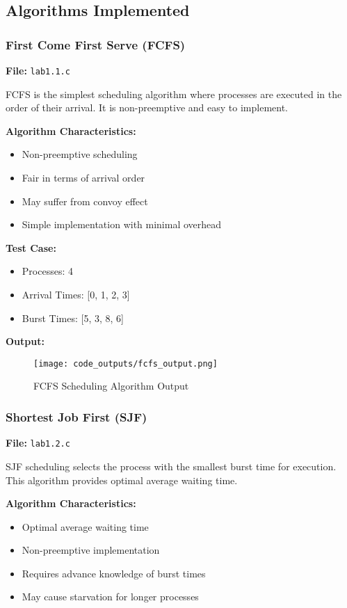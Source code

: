 \documentclass[12pt,a4paper]{article}
\begin{document}
\subsection{Algorithms Implemented}

\subsubsection{First Come First Serve (FCFS)}
\textbf{File:} \texttt{lab1.1.c}

FCFS is the simplest scheduling algorithm where processes are executed in the order of their arrival. It is non-preemptive and easy to implement.

\textbf{Algorithm Characteristics:}
\begin{itemize}
    \item Non-preemptive scheduling
    \item Fair in terms of arrival order
    \item May suffer from convoy effect
    \item Simple implementation with minimal overhead
\end{itemize}

\textbf{Test Case:}
\begin{itemize}
    \item Processes: 4
    \item Arrival Times: [0, 1, 2, 3]
    \item Burst Times: [5, 3, 8, 6]
\end{itemize}

\textbf{Output:}
\begin{figure}[H]
    \centering
    \texttt{[image: code\_outputs/fcfs\_output.png]}
    \caption{FCFS Scheduling Algorithm Output}
    \label{fig:fcfs_output}
\end{figure}

\vspace{3cm}

\subsubsection{Shortest Job First (SJF)}
\textbf{File:} \texttt{lab1.2.c}

SJF scheduling selects the process with the smallest burst time for execution. This algorithm provides optimal average waiting time.

\textbf{Algorithm Characteristics:}
\begin{itemize}
    \item Optimal average waiting time
    \item Non-preemptive implementation
    \item Requires advance knowledge of burst times
    \item May cause starvation for longer processes
\end{itemize}
\end{document}
